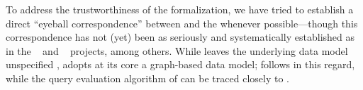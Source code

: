 


To address the trustworthiness of the \gcoql formalization, we have tried to establish a direct ``eyeball correspondence'' between \gcoql and the \spec whenever possible---though this correspondence has not (yet) been as seriously and systematically established as in the \jscert~\cite{jscert} and \coqr~\cite{coqr} projects, among others.
While \spec leaves the underlying data model unspecified , 
\HP adopts at its core a graph-based data model; \gcoql follows \HP in this regard, while the query evaluation algorithm of \gcoql can be traced closely to \spec.


